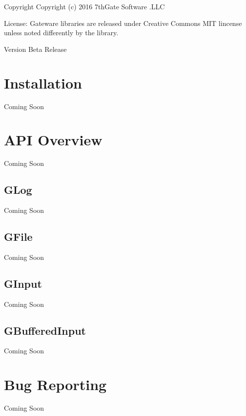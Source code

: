 \begin{DoxyCopyright}{Copyright}
Copyright (c) 2016 7th\+Gate Software .L\+LC 
\end{DoxyCopyright}
\begin{DoxyParagraph}{License\+:}
Gateware libraries are released under Creative Commons M\+IT lincense unless noted differently by the library. 
\end{DoxyParagraph}
\begin{DoxyVersion}{Version}
Beta Release
\end{DoxyVersion}
\hypertarget{index_Install}{}\section{Installation}\label{index_Install}
Coming Soon\hypertarget{index_API}{}\section{A\+P\+I Overview}\label{index_API}
Coming Soon\hypertarget{index_APIGLog}{}\subsection{G\+Log}\label{index_APIGLog}
Coming Soon\hypertarget{index_APIGFile}{}\subsection{G\+File}\label{index_APIGFile}
Coming Soon\hypertarget{index_APIGInput}{}\subsection{G\+Input}\label{index_APIGInput}
Coming Soon\hypertarget{index_APIGBufferedInput}{}\subsection{G\+Buffered\+Input}\label{index_APIGBufferedInput}
Coming Soon\hypertarget{index_Reporting}{}\section{Bug Reporting}\label{index_Reporting}
Coming Soon 